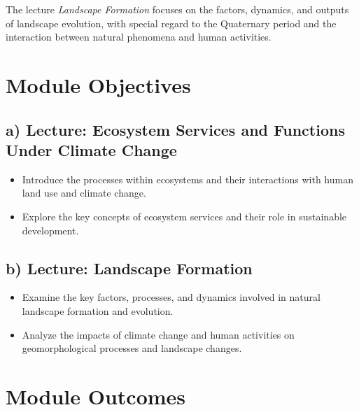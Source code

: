 \documentclass[
  letterpaper,
  10pt,
  openany]{book}
\providecommand{\tightlist}{%
  \setlength{\itemsep}{0pt}\setlength{\parskip}{0pt}}\usepackage{longtable,booktabs,array}
\begin{document}
The lecture \emph{Landscape Formation} focuses on the factors, dynamics,
and outputs of landscape evolution, with special regard to the
Quaternary period and the interaction between natural phenomena and
human activities.

\section*{Module Objectives}\label{module-objectives-2}


\subsection*{a) Lecture: Ecosystem Services and Functions Under Climate
Change}\label{a-lecture-ecosystem-services-and-functions-under-climate-change}

\begin{itemize}
\tightlist
\item
  Introduce the processes within ecosystems and their interactions with
  human land use and climate change.
\item
  Explore the key concepts of ecosystem services and their role in
  sustainable development.
\end{itemize}

\subsection*{b) Lecture: Landscape
Formation}\label{b-lecture-landscape-formation}

\begin{itemize}
\tightlist
\item
  Examine the key factors, processes, and dynamics involved in natural
  landscape formation and evolution.
\item
  Analyze the impacts of climate change and human activities on
  geomorphological processes and landscape changes.
\end{itemize}

\section*{Module Outcomes}\label{module-outcomes-2}
\end{document}

